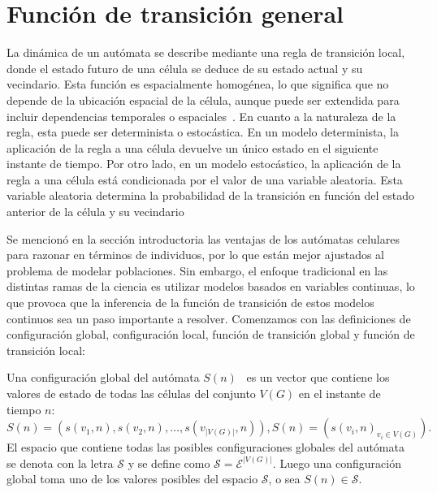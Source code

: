 \section{Funci\'on de transici\'on general}
\label{subsec-function}
La dinámica de un autómata se describe mediante una regla de transición local, donde el estado futuro de una célula se deduce de su estado actual y su vecindario. Esta función es espacialmente homogénea, lo que significa que no depende de la ubicación espacial de la célula, aunque puede ser extendida para incluir dependencias temporales o espaciales~\cite{book}. En cuanto a la naturaleza de la regla, esta puede ser determinista o estocástica. En un modelo determinista, la aplicación de la regla a una célula devuelve un único estado en el siguiente instante de tiempo. Por otro lado, en un modelo estocástico, la aplicación de la regla a una célula está condicionada por el valor de una variable aleatoria. Esta variable aleatoria determina la probabilidad de la transición en función del estado anterior de la célula y su vecindario~\cite{book}

Se mencion\'o en la secci\'on introductoria las ventajas de los aut\'omatas celulares para razonar en t\'erminos de individuos, por lo que est\'an mejor ajustados al problema de modelar poblaciones. Sin embargo, el enfoque tradicional en las distintas ramas de la ciencia es utilizar modelos basados en variables continuas, lo que provoca que la inferencia de la funci\'on de transici\'on de estos modelos continuos sea un paso importante a resolver. Comenzamos con las definiciones de configuraci\'on global, configuraci\'on local, funci\'on de transici\'on global y funci\'on de transici\'on local:

\begin{definition}
\label{def-global-conf}
Una configuraci\'on global del aut\'omata $S(n)$~\cite{book} es un vector que contiene los valores de estado de todas las c\'elulas del conjunto $V(G)$ en el instante de tiempo $n$:
\begin{subequations}
\begin{equation}
S(n)=\left(s(v_1,n),s(v_2,n),\ldots,s(v_{|V(G)|},n)\right), \label{eq-global-conf}
\end{equation}
\begin{equation}
S(n)=\left(s(v_i,n)_{v_i \in V(G)}\right). \label{eq-global-conf-2}
\end{equation}
\end{subequations}
El espacio que contiene todas las posibles configuraciones globales del aut\'omata se denota con la letra $\mathcal{S}$ y se define como $\mathcal{S}=\mathcal{E}^{|V(G)|}$. Luego una configuraci\'on global toma uno de los valores posibles del espacio $\mathcal{S}$, o sea $S(n) \in \mathcal{S}$.
\end{definition}

